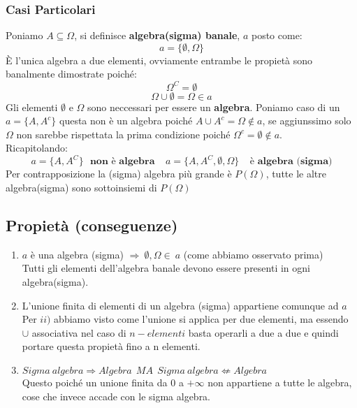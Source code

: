 \subsubsection{Casi Particolari}
Poniamo $A \subseteq \Omega$, si definisce \textbf{algebra(sigma) banale}, $a$ posto come:
$$ a = \{\emptyset, \Omega \}$$
È l'unica algebra a due elementi, ovviamente entrambe le propietà sono banalmente dimostrate poiché:
$$ \Omega^C = \emptyset $$
$$ \Omega \cup \emptyset = \Omega \in a $$
Gli elementi $\emptyset$ e $\Omega$ sono neccessari per essere un \textbf{algebra}.
Poniamo caso di un $a=\{A, A^c\}$ questa non è un algebra poiché $A \cup A^c = \Omega \not \in a$, se aggiunssimo solo $\Omega$ non sarebbe rispettata la prima condizione poiché $ \Omega^c = \emptyset \not \in a$.\\
Ricapitolando:
$$ a=\{A, A^C\} \:\:\: \textbf{non è algebra} \:\:\:\:\: a=\{A,A^C,\emptyset,\Omega\} \:\:\:\:\:\textbf{è algebra (sigma)}$$
Per contrapposizione la (sigma) algebra più grande è $P(\Omega)$, tutte le altre algebra(sigma) sono sottoinsiemi di $P(\Omega)$

\subsection{Propietà (conseguenze)}
\begin{enumerate}
\item $a$ è una algebra (sigma) $\Rightarrow \: \emptyset,\Omega \in \: a$ (come abbiamo osservato prima)\\Tutti gli elementi dell'algebra banale devono essere presenti in ogni algebra(sigma).
\item L'unione finita di elementi di un algebra (sigma) appartiene comunque ad $a$\\ Per $ii)$ abbiamo visto come l'unione si applica per due elementi, ma essendo $\cup$ associativa nel caso di $n-elementi$ basta operarli a due a due e quindi portare questa propietà fino a n elementi.
\item $ Sigma\:algebra \Rightarrow Algebra \:\:MA\:\: Sigma\: algebra \not \Leftarrow Algebra $\\
Questo poiché un unione finita da 0 a $+\infty$ non appartiene a tutte le algebra, cose che invece accade con le sigma algebra.
\end{enumerate}







